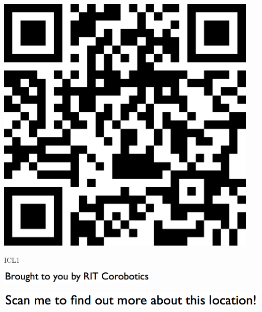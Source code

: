 \documentclass[letterpaper]{article}
\begin{document}
 \begingroup 
 \centerline{\includegraphics[scale=1,width=5in,height=5in]{ICL1.png}} 
 \endgroup 
 \vspace*{\fill} 

 \hfill{\small ICL1} 

  \vspace{0.7in} 
 
 \centerline{\includegraphics[scale=1,width=3in]{text-bottom.png}} 
 
 \pagebreak 
{} 
 \vspace*{\fill} 
 
  \centerline{\includegraphics[scale=1,width=6in]{text-top.png}} 
 
 \vspace{0.5in} 
 
\end{document}
